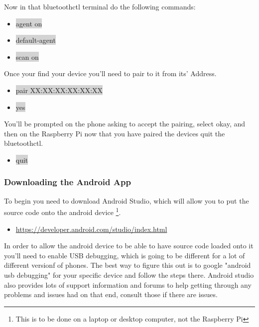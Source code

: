 \documentclass[12pt]{article}
\begin{document}
\noindent Now in that bluetoothctl terminal do the following commands:

\begin{itemize}
	\item[] \colorbox{lightgray}{agent on}
	\item[] \colorbox{lightgray}{default-agent}
	\item[] \colorbox{lightgray}{scan on}
\end{itemize}

\noindent Once your find your device you'll need to pair to it from its' Address.

\begin{itemize} 	
	\item[] \colorbox{lightgray}{pair XX:XX:XX:XX:XX:XX} 
	\item[] \colorbox{lightgray}{yes}
\end{itemize}
	
\noindent You'll be prompted on the phone asking to accept the pairing, select okay, and then on the Raspberry Pi now that you have paired the devices quit the bluetoothctl.
\begin{itemize}
	\item[] \colorbox{lightgray}{quit} 
\end{itemize}

\subsubsection{Downloading the Android App}

To begin you need to download Android Studio, which will allow you to put the source code onto the android device \footnote{This is to be done on a laptop or desktop computer, not the Raspberry Pi}.

\begin{itemize}
	\item \href{https://developer.android.com/studio/index.html}{https://developer.android.com/studio/index.html}
\end{itemize}

\noindent In order to allow the android device to be able to have source code loaded onto it you'll need to enable USB debugging, which is going to be different for a lot of different versionf of phones. The best way to figure this out is to google "android usb debugging" for your specific device and follow the steps there. Android studio also provides lots of support information and forums to help getting through any problems and issues had on that end, consult those if there are issues.
\end{document}
